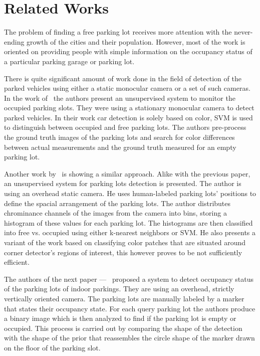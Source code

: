 \chapter{Related Works}\label{cha:related_works}

The problem of finding a free parking lot receives more attention with the
never-ending growth of the cities and their population.
However, most of the work is oriented on providing people with simple
information on the occupancy status of a particular parking garage or parking
lot.

There is quite significant amount of work done in the field of detection of the
parked vehicles using either a static monocular camera or a set of such cameras.
In the work of~\cite{qizhang06} the authors present an unsupervised system to
monitor the occupied parking slots. They were using a stationary monocular
camera to detect parked vehicles.
In their work car detection is solely based on color, SVM is used to distinguish
between occupied and free parking lots. The authors pre-process the ground truth
images of the parking lots and search for color differences between actual
measurements and the ground truth measured for an empty parking lot.

Another work by~\cite{nicolastrue} is showing a similar approach. Alike with the
previous paper, an unsupervised system for parking lots detection is presented.
The author is using an overhead static camera. He uses human-labeled parking
lots' positions to define the spacial arrangement of the parking lots. The
author distributes chrominance channels of the images from the camera into bins,
storing a histogram of these values for each parking lot. The histograms are
then classified into free vs. occupied using either k-nearest neighbors or SVM.
He also presents a variant of the work based on classifying color patches that
are situated around corner detector's regions of interest, this however proves
to be not sufficiently efficient.

The authors of the next paper ---~\cite{yusnita12} proposed a system to detect
occupancy status of the parking lots of indoor parkings. They are using an
overhead, strictly vertically oriented camera. The parking lots are manually
labeled by a marker that states their occupancy state. For each query parking
lot the authors produce a binary image which is then analyzed to find if the
parking lot is empty or occupied. This process is carried out by comparing the
shape of the detection with the shape of the prior that reassembles the circle
shape of the marker drawn on the floor of the parking slot.

